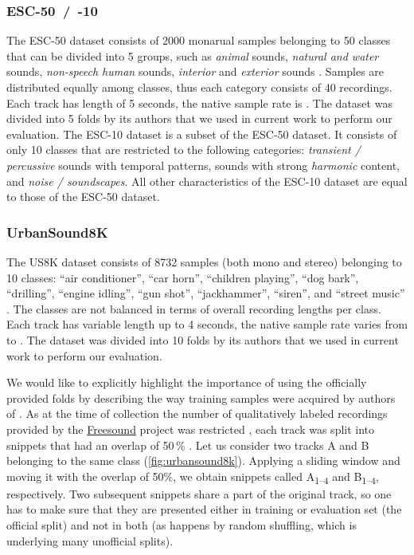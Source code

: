 \documentclass[a4paper,conference]{IEEEtran}
\begin{document}
\subsubsection{\mbox{ESC-50 / -10}}
The \mbox{ESC-50} dataset consists of 2000 monarual samples belonging to 50 classes that can be divided into 5 groups, such as \emph{animal} sounds, \emph{natural and water} sounds, \emph{non-speech human} sounds, \emph{interior} and \emph{exterior} sounds \cite{piczak2015esc}.
Samples are distributed equally among classes, thus each category consists of 40 recordings.
Each track has length of 5 seconds, the native sample rate is .
The dataset was divided into 5 folds by its authors that we used in current work to perform our evaluation.
The \mbox{ESC-10} dataset is a subset of the \mbox{ESC-50} dataset.
It consists of only 10 classes that are restricted to the following categories: \emph{transient / percussive} sounds with temporal patterns, sounds with strong \emph{harmonic} content, and \emph{noise / soundscapes}.
All other characteristics of the \mbox{ESC-10} dataset are equal to those of the \mbox{ESC-50} dataset.

\subsubsection{UrbanSound8K} \label{sssec:us8k}
The US8K dataset consists of 8732 samples (both mono and stereo) belonging to 10 classes: ``air conditioner'', ``car horn'', ``children playing'', ``dog bark'', ``drilling'', ``engine idling'', ``gun shot'', ``jackhammer'', ``siren'', and ``street music'' \cite{salamon2014us8k}.
The classes are not balanced in terms of overall recording lengths per class.
Each track has variable length up to 4 seconds, the native sample rate varies from  to .
The dataset was divided into 10 folds by its authors that we used in current work to perform our evaluation.

We would like to explicitly highlight the importance of using the officially provided folds by describing the way training samples were acquired by authors of \cite{salamon2014us8k}.
As at the time of collection the number of qualitatively labeled recordings provided by the \href{https://freesound.org/}{Freesound} project \cite{freesound2013} was restricted \cite{salamon2014us8k}, each track was split into snippets that had an overlap of 50\,\% \cite{salamon2014us8k}.
Let us consider two tracks A and B belonging to the same class (\autoref{fig:urbansound8k}).
Applying a sliding window and moving it with the overlap of 50\:\%, we obtain snippets called A\textsubscript{1--4} and B\textsubscript{1--4}, respectively.
Two subsequent snippets share a part of the original track, so one has to make sure that they are presented either in training or evaluation set (the official split) and not in both (as happens by random shuffling, which is underlying many unofficial splits).
\end{document}

